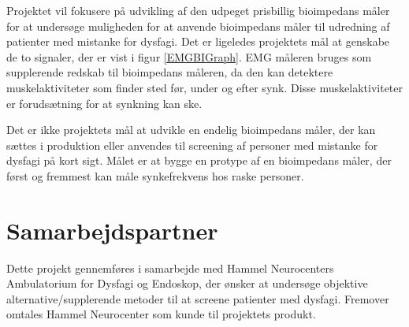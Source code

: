 Projektet vil fokusere på udvikling af den udpeget prisbillig bioimpedans måler for at undersøge muligheden for at anvende bioimpedans måler til udredning af patienter med mistanke for dysfagi. Det er ligeledes projektets mål at genskabe de to signaler, der er vist i figur \ref{EMGBIGraph}. EMG måleren bruges som supplerende redskab til bioimpedans måleren, da den kan detektere muskelaktiviteter som finder sted før, under og efter synk. Disse muskelaktiviteter er forudsætning for at synkning kan ske. 

Det er ikke projektets mål at udvikle en endelig bioimpedans måler, der kan sættes i produktion eller anvendes til screening af personer med mistanke for dysfagi på kort sigt. Målet er at bygge en protype af en bioimpedans måler, der først og fremmest kan måle synkefrekvens hos raske personer. 

\section{Samarbejdspartner}
Dette projekt gennemføres i samarbejde med Hammel Neurocenters Ambulatorium for Dysfagi og Endoskop, der ønsker at undersøge objektive alternative/supplerende metoder til at screene patienter med dysfagi. Fremover omtales Hammel Neurocenter som kunde til projektets produkt. 

